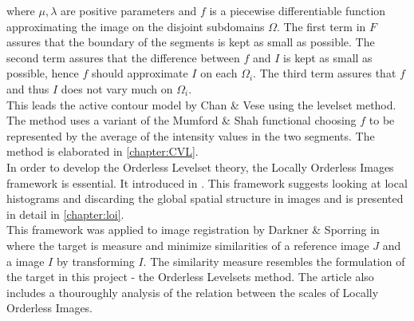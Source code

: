 where $\mu,\lambda$ are positive parameters and $f$ is a piecewise differentiable function approximating the image on the disjoint subdomains $\Omega$. The first term in $F$ assures that the boundary of the segments is kept as small as possible. The second term assures that the difference between $f$ and $I$ is kept as small as possible, hence $f$ should approximate $I$ on each $\Omega_i$. The third term assures that $f$ and thus $I$ does not vary much on $\Omega_i$.\\
This leads the active contour model by Chan \& Vese \cite{chan.01} using the levelset method. The method uses a variant of the Mumford \& Shah functional choosing $f$ to be represented by the average of the intensity values in the two segments. The method is elaborated in \cref{chapter:CVL}.\\

In order to develop the Orderless Levelset theory, the Locally Orderless Images framework is essential. It introduced in \cite{griffin.97, koe.99}. This framework suggests looking at local histograms and discarding the global spatial structure in images and is presented in detail in \cref{chapter:loi}.\\
This framework was applied to image registration by Darkner \& Sporring in \cite{dar.11,dar.12} where the target is measure and minimize similarities of a reference image $J$ and a image $I$ by transforming $I$. The similarity measure resembles the formulation of the target in this project - the Orderless Levelsets method. The article also includes a thouroughly analysis of the relation between the scales of Locally Orderless Images.